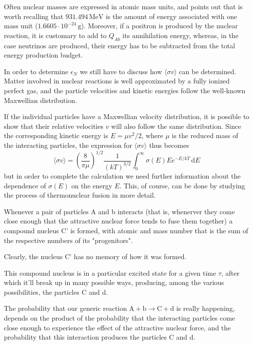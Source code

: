 Often nuclear masses are expressed in atomic mass units, and \cite{2005essp.book.....S} points out that is worth recalling that $931.494\,\text{MeV}$ is the amount of energy associated with one mass unit ($1.6605\cdot 10^{-24}\,\text{g}$). Moreover, if a positron is produced by the nuclear reaction, it is customary to add to $Q_{Ab}$ its annihilation energy, whereas, in the case neutrinos are produced, their energy has to be subtracted from the total energy production budget.
\par In order to determine $\epsilon_{N}$ we still have to discuss how $\langle \sigma v \rangle$ can be determined. Matter involved in nuclear reactions is well approximated by a fully ionized perfect gas, and the particle velocities and kinetic energies follow the well-known Maxwellian distribution. 
\par If the individual particles have a Maxwellian velocity distribution, it is possible to show that their relative velocities $v$ will also follow the same distribution. Since the corresponding kinetic energy is $E = \mu v^{2}/2$, where $\mu$ is the reduced mass of the interacting particles, the expression for $\langle \sigma v \rangle$ thus becomes
\begin{equation*}
    \langle \sigma v \rangle = \left(\frac{8}{\pi \mu}\right)^{1/2}\frac{1}{(kT)^{3/2}}\int_{0}^{\infty}\sigma(E)E e^{-E/kT}\,\text{d}E
\end{equation*}
but in order to complete the calculation we need further information about the dependence of $\sigma(E)$ on the energy $E$. This, of course, can be done by studying the process of thermonuclear fusion in more detail.
\par Whenever a pair of particles A and b interacts (that is, whenerver they come close enough that the attractive nuclear force tends to fuse them together) a compound nucleus C' is formed, with atomic and mass number that is the sum of the respective numbers of its "progenitors". 
\par Clearly, the nucleus C' has no memory of how it was formed. 
\par This compound nucleus is in a particular excited state for a given time $\tau$, after which it'll break up in many possible ways, producing, among the various possibilities, the particles C and d.
\par The probability that our generic reaction $\text{A}+\text{b}\to \text{C}+\text{d}$ is really happening, depends on the product of the probability that the interacting particles come close enough to experience the effect of the attractive nuclear force, and the probability that this interaction produces the particles C and d.
